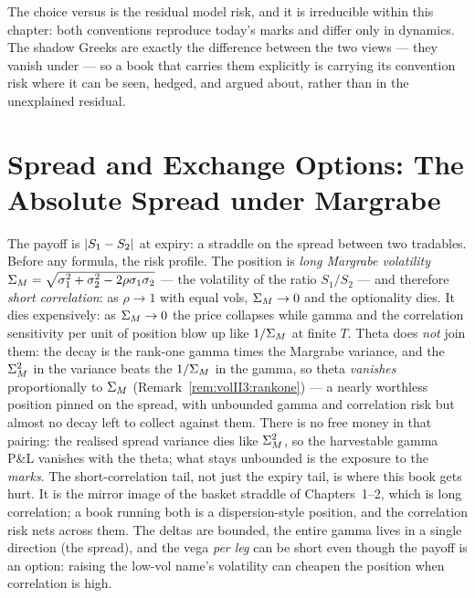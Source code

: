 The choice \stickyrho{} versus \stickycvc{} is the residual model risk,
and it is irreducible within this chapter: both conventions reproduce
today's marks and differ only in dynamics. The shadow Greeks are exactly
the difference between the two views --- they vanish under \stickyrho{}
--- so a book that carries them explicitly is carrying its convention risk
where it can be seen, hedged, and argued about, rather than in the
unexplained residual.


\chapter{Spread and Exchange Options: The Absolute Spread under Margrabe}
\label{ch:volII:spread}

The payoff is $\lvert S_1 - S_2\rvert$ at expiry: a straddle on the spread between two
tradables. Before any formula, the risk profile. The position is \emph{long
Margrabe volatility} $\Sigma_M = \sqrt{\sigma_1^2 + \sigma_2^2 -
2\rho\sigma_1\sigma_2}$ --- the volatility of the ratio $S_1/S_2$ --- and
therefore \emph{short correlation}: as $\rho \to 1$ with equal vols, $\Sigma_M
\to 0$ and the optionality dies. It dies expensively: as $\Sigma_M \to 0$ the
price collapses while gamma and the correlation sensitivity per unit of
position blow up like $1/\Sigma_M$ at finite $T$. Theta does \emph{not} join
them: the decay is the rank-one gamma times the Margrabe variance, and the
$\Sigma_M^2$ in the variance beats the $1/\Sigma_M$ in the gamma, so theta
\emph{vanishes} proportionally to $\Sigma_M$
(Remark~\ref{rem:volII3:rankone}) --- a nearly worthless position pinned on
the spread, with unbounded gamma and correlation risk but almost no decay
left to collect against them. There is no free money in that pairing: the
realised spread variance dies like $\Sigma_M^2$, so the harvestable gamma
P\&L vanishes with the theta; what stays unbounded is the exposure to the
\emph{marks}. The short-correlation tail, not
just the expiry tail, is where this book gets hurt. It is the mirror image of the basket straddle
of Chapters~1--2, which is long correlation; a book running both is a
dispersion-style position, and the correlation risk nets across them. The
deltas are bounded, the entire gamma lives in a single direction (the spread),
and the vega \emph{per leg} can be short even
though the payoff is an option: raising the low-vol name's volatility can
cheapen the position when correlation is high.

